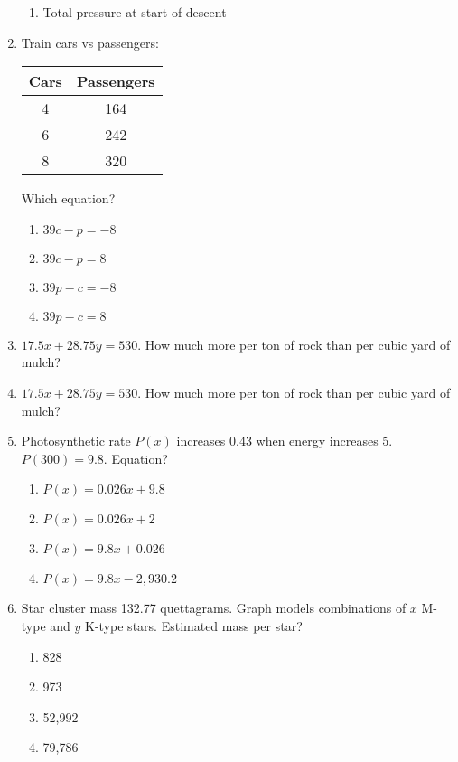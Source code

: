 \documentclass[12pt]{exam}
\begin{document}
\begin{enumerate}
\begin{enumerate}[label=\Alph*)]
        \item Total pressure at start of descent
    \end{enumerate}
    \item Train cars vs passengers:
    \begin{center}
        \begin{tabular}{|c|c|}
            \hline
            Cars & Passengers \\
            \hline
            4 & 164 \\
            6 & 242 \\
            8 & 320 \\
            \hline
        \end{tabular}
    \end{center}
    Which equation?
    \begin{enumerate}[label=\Alph*)]
        \item $39c - p = -8$
        \item $39c - p = 8$
        \item $39p - c = -8$
        \item $39p - c = 8$
    \end{enumerate}
    \item $17.5x + 28.75y = 530$. How much more per ton of rock than per cubic yard of mulch?
    \item $17.5x + 28.75y = 530$. How much more per ton of rock than per cubic yard of mulch?
    \item Photosynthetic rate $P(x)$ increases 0.43 when energy increases 5. $P(300) = 9.8$. Equation?
    \begin{enumerate}[label=\Alph*)]
        \item $P(x) = 0.026x + 9.8$
        \item $P(x) = 0.026x + 2$
        \item $P(x) = 9.8x + 0.026$
        \item $P(x) = 9.8x - 2,930.2$
    \end{enumerate}
    \item Star cluster mass 132.77 quettagrams. Graph models combinations of $x$ M-type and $y$ K-type stars. Estimated mass per star?
    \begin{enumerate}[label=\Alph*)]
        \item 828
        \item 973
        \item 52,992
        \item 79,786

\end{enumerate}
\end{enumerate}
\end{document}
